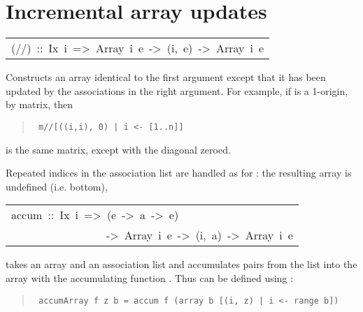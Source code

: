 \section{Incremental array updates
}
\begin{haddockdesc}
\item[\begin{tabular}{@{}l}
(//)\ ::\ Ix\ i\ =>\ Array\ i\ e\ ->\ {\char 91}(i,\ e){\char 93}\ ->\ Array\ i\ e
\end{tabular}]\haddockbegindoc
Constructs an array identical to the first argument except that it has
 been updated by the associations in the right argument.
 For example, if  is a 1-origin,  by  matrix, then
\par
\begin{quote}
{\haddockverb\begin{verbatim}
 m//[((i,i), 0) | i <- [1..n]]
\end{verbatim}}
\end{quote}
is the same matrix, except with the diagonal zeroed.
\par
Repeated indices in the association list are handled as for :
 the resulting array is undefined (i.e. bottom),
\par

\end{haddockdesc}
\begin{haddockdesc}
\item[\begin{tabular}{@{}l}
accum\ ::\ Ix\ i\ =>\ (e\ ->\ a\ ->\ e)\\\ \ \ \ \ \ \ \ \ \ \ \ \ \ \ \ \ ->\ Array\ i\ e\ ->\ {\char 91}(i,\ a){\char 93}\ ->\ Array\ i\ e
\end{tabular}]\haddockbegindoc
{} takes an array and an association list and accumulates
 pairs from the list into the array with the accumulating function .
 Thus  can be defined using :
\par
\begin{quote}
{\haddockverb\begin{verbatim}
 accumArray f z b = accum f (array b [(i, z) | i <- range b])
\end{verbatim}}
\end{quote}

\end{haddockdesc}
